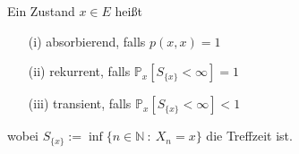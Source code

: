 Ein Zustand $x \in E$ heißt
\begin{itemize}
\item[(i)] absorbierend, falls $p(x,x)=1$
\item[(ii)] rekurrent, falls $\mathbb{P}_{x}[S_{\lbrace x \rbrace} < \infty] = 1$
\item[(iii)] transient, falls $\mathbb{P}_{x}[S_{\lbrace x \rbrace} < \infty] < 1$
\end{itemize}
wobei $S_{\lbrace x \rbrace} := \inf \lbrace n \in \mathbb{N} \: : \: X_{n} = x \rbrace$ die Treffzeit ist. 